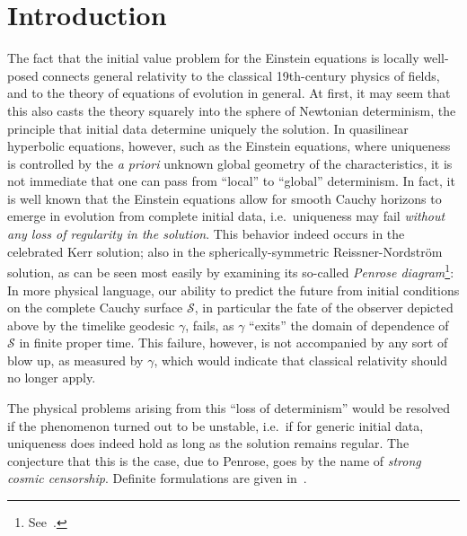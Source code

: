 \documentclass{article}
\begin{document}
\section{Introduction}
The fact that the
initial value problem for the Einstein equations is locally
well-posed connects
general relativity to the classical 19th-century physics of fields,
and to the theory of equations of evolution in general. At first,
it may seem that this also casts the theory squarely into the sphere
of Newtonian determinism, the principle that initial data
determine uniquely the solution. In quasilinear hyperbolic
equations, however, such as the Einstein equations, where uniqueness
is controlled by the \emph{a priori} unknown
global geometry of the characteristics,
it is not immediate that one can pass from ``local'' to ``global'' 
determinism. In fact, it is well known that the Einstein equations
allow for smooth Cauchy horizons 
to emerge in 
evolution from complete initial data,
i.e.~uniqueness may fail \emph{without any loss of regularity 
in the solution}. This behavior indeed occurs in the celebrated 
Kerr solution; also in the spherically-symmetric
Reissner-Nordstr\"om solution, as can be seen most
easily by examining its so-called
\emph{Penrose diagram}\footnote{See~\cite{mi:mazi}.}:
\[

\]
In more physical language, 
our ability to predict the future from initial conditions on the complete
Cauchy surface $\mathcal{S}$, in particular the fate of the 
observer depicted above by the timelike geodesic $\gamma$, fails,
as $\gamma$ ``exits'' the domain of dependence of $\mathcal{S}$
in finite proper time.
This failure, however, is not accompanied by
any sort of blow up, as measured by $\gamma$, which would indicate
that classical relativity should no longer apply.

The physical problems arising from this ``loss of determinism''
would be resolved if the phenomenon turned out to be unstable, 
i.e.~if for generic initial data,
uniqueness does indeed hold as long as the solution remains regular. 
The conjecture that this is the case, due to Penrose, goes by the name of 
\emph{strong cosmic censorship}. Definite formulations are given
in~\cite{mi:mazi, md:si, chr:givp, chru:uitl}.
\end{document}
